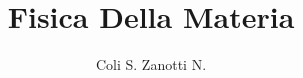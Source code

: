 \documentclass[12pt, a4paper]{book}
\begin{document}
\title{Fisica Della Materia}
\author{Coli S. Zanotti N.}
\maketitle

\end{document}
